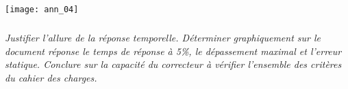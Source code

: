 \begin{multicols}{2}
\begin{center}
\texttt{[image: ann\_04]}
\end{center}


\subparagraph{} \textit{Justifier l'allure de la réponse temporelle. Déterminer graphiquement sur le document réponse le temps de réponse à 5\%, le dépassement maximal et l'erreur statique. Conclure sur la capacité du correcteur à
vérifier l'ensemble des critères du cahier des charges.}
\ifprof
\begin{corrige}
\end{corrige}
\else
\fi



\ifprof
\else
\end{multicols}
\fi

